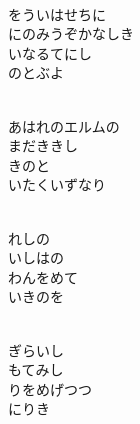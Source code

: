 \documentclass[10pt,b5j]{tarticle} %
\begin{document}
\vspace{1.5em} %
\newcommand{\linespace}{0.5em} %
\newcommand{\blocksize}{0.5\hsize} %
\newcommand{\itemmargin}{6em} %
\begin{enumerate} %
    \setlength{\itemindent}{\itemmargin} %
    \begin{minipage}[c]{\blocksize}
    
        \vspace{\linespace}
        \item~\\
        をういはせちに\\
        にのみうぞかなしき\\
        いなるてにし\\
        のとぶよ
        
        \vspace{\linespace}
        \item~\\
        あはれのエルムの\\
        まだききし\\
        きのと\\
        いたくいずなり
        
        \vspace{\linespace}
        \item~\\
        れしの\\
        いしはの\\
        わんをめて\\
        いきのを
        
        \vspace{\linespace}
        \item~\\
        ぎらいし\\
        もてみし\\
        りをめげつつ\\
        にりき
        

\end{minipage}
\end{enumerate}
\end{document}

